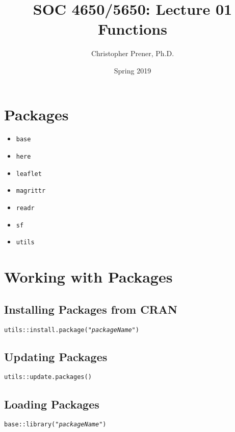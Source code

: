 \documentclass{tufte-handout}
\title{SOC 4650/5650: Lecture 01 Functions}
\author{Christopher Prener, Ph.D.}
\date{Spring 2019}
\newenvironment{subs}
  {\adjustwidth{3em}{0pt}}
  {\endadjustwidth}
\begin{document}
\maketitle %

\vspace{5mm}
\section{Packages}
\begin{itemize}
\item \texttt{base}
\item \texttt{here}
\item \texttt{leaflet}
\item \texttt{magrittr}
\item \texttt{readr}
\item \texttt{sf}
\item \texttt{utils}
\end{itemize}

\vspace{2mm}
\section{Working with Packages}
\begin{subs}
\subsection{Installing Packages from CRAN}
\texttt{utils::}{\color{red}\texttt{install.package}}\texttt{("\textit{packageName}")}

\vspace{3mm}
\subsection{Updating Packages}
\texttt{utils::}{\color{red}\texttt{update.packages}}\texttt{()}

\vspace{3mm}
\subsection{Loading Packages}
\texttt{base::}{\color{red}\texttt{library}}\texttt{("\textit{packageName}")}

\end{subs}
\end{document}
